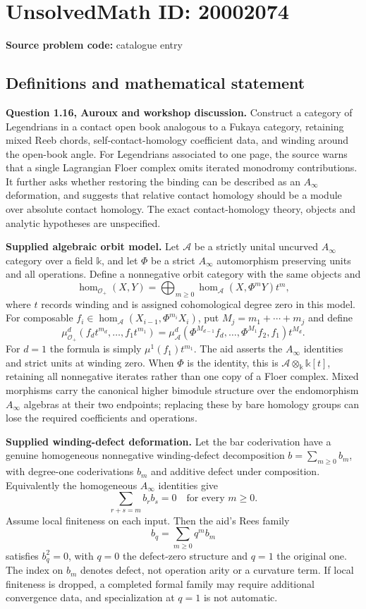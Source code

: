\documentclass[11pt]{article}
\begin{document}
\section*{UnsolvedMath ID: 20002074}
\textbf{Source problem code:} catalogue entry
\subsection{Definitions and mathematical statement}
\textbf{Question 1.16, Auroux and workshop discussion.} Construct a category of Legendrians in a contact open book analogous to a Fukaya category, retaining mixed Reeb chords, self-contact-homology coefficient data, and winding around the open-book angle. For Legendrians associated to one page, the source warns that a single Lagrangian Floer complex omits iterated monodromy contributions. It further asks whether restoring the binding can be described as an $A_\infty$ deformation, and suggests that relative contact homology should be a module over absolute contact homology. The exact contact-homology theory, objects and analytic hypotheses are unspecified.

\textbf{Supplied algebraic orbit model.} Let $\mathcal A$ be a strictly unital uncurved $A_\infty$ category over a field $\mathbb k$, and let $\Phi$ be a strict $A_\infty$ automorphism preserving units and all operations. Define a nonnegative orbit category with the same objects and
\[
 \operatorname{hom}_{\mathcal O_+}(X,Y)
    =\bigoplus_{m\ge0}\operatorname{hom}_{\mathcal A}(X,\Phi^mY)t^m,
\]
where $t$ records winding and is assigned cohomological degree zero in this model. For composable $f_i\in\operatorname{hom}_{\mathcal A}(X_{i-1},\Phi^{m_i}X_i)$, put $M_j=m_1+\cdots+m_j$ and define
\[
 \mu_{\mathcal O_+}^d(f_dt^{m_d},\ldots,f_1t^{m_1})
  =\mu_{\mathcal A}^d(\Phi^{M_{d-1}}f_d,\ldots,
                         \Phi^{M_1}f_2,f_1)t^{M_d}.
\]
For $d=1$ the formula is simply $\mu^1(f_1)t^{m_1}$. The aid asserts the $A_\infty$ identities and strict units at winding zero. When $\Phi$ is the identity, this is $\mathcal A\otimes_{\mathbb k}\mathbb k[t]$, retaining all nonnegative iterates rather than one copy of a Floer complex. Mixed morphisms carry the canonical higher bimodule structure over the endomorphism $A_\infty$ algebras at their two endpoints; replacing these by bare homology groups can lose the required coefficients and operations.

\textbf{Supplied winding-defect deformation.} Let the bar coderivation have a genuine homogeneous nonnegative winding-defect decomposition $b=\sum_{m\ge0}b_m$, with degree-one coderivations $b_m$ and additive defect under composition. Equivalently the homogeneous $A_\infty$ identities give
\[
 \sum_{r+s=m}b_rb_s=0\quad\text{for every }m\ge0.
\]
Assume local finiteness on each input. Then the aid's Rees family
\[
 b_q=\sum_{m\ge0}q^m b_m
\]
satisfies $b_q^2=0$, with $q=0$ the defect-zero structure and $q=1$ the original one. The index on $b_m$ denotes defect, not operation arity or a curvature term. If local finiteness is dropped, a completed formal family may require additional convergence data, and specialization at $q=1$ is not automatic.
\end{document}
